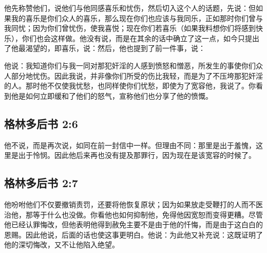 他先称赞他们，说他们与他同感喜乐和忧伤，然后切入这个人的话题，先说：但如果我的喜乐是你们众人的喜乐，那么现在你们也应该与我同乐，正如那时你们曾与我同忧；因为你们曾忧伤，使我喜悦；现在你们若喜乐（如果我料想你们将感到快乐），你们也会这样做。他没有说，而是在其余的话中确立了这一点，如今只提出了他最渴望的，即喜乐，说：然后，他也提到了前一件事，说：\par

\par

他说：我知道你们与我一同对那犯奸淫的人感到愤怒和憎恶，所发生的事使你们众人部分地忧伤。因此我说，并非像你们所受的伤比我轻，而是为了不压垮那犯奸淫的人。那时他不仅使我忧愁，也同样使你们忧愁，即使为了宽容他，我说了。你看到他是如何立即缓和了他们的怒气，宣称他们也分享了他的愤慨。\par


\subsection{格林多后书 2:6}

\par

他不说，而是再次说，如同在前一封信中一样。但理由不同：那里是出于羞愧，这里是出于怜悯。因此他后来再也没有提及那罪行，因为现在是该宽容的时候了。\par


\subsection{格林多后书 2:7}

\par

他吩咐他们不仅要撤销责罚，还要将他恢复原状；因为如果放走受鞭打的人而不医治他，那等于什么也没做。你看他也如何抑制他，免得他因宽恕而变得更糟。尽管他已经认罪悔改，但他表明他得到赦免主要不是由于他的忏悔，而是由于这白白的恩赐。因此他说，后面的话也使这事更明白。他说：为此他又补充说：这既证明了他的深切悔改，又不让他陷入绝望。\par

